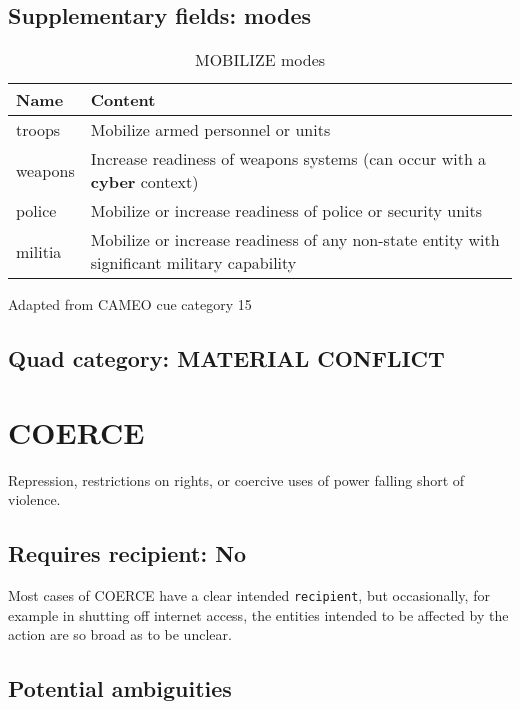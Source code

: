 \documentclass[11pt]{report}
\newcommand{\plcat}[1]{\textsf{#1}}
\newcommand{\plcon}[1]{\textbf{#1}}
\newcommand{\txt}[1]{\texttt{#1}}
\begin{document}
\subsection{Supplementary fields: modes }

\begin{table}[htp]
\caption{MOBILIZE modes}
\begin{center}
\begin{tabular}{|l|p{13cm}|}
\hline
Name & Content \\
\hline
troops & Mobilize armed personnel or units\\
weapons & Increase readiness of weapons systems (can occur with a \plcon{cyber} context) \\
police & Mobilize or increase readiness of police or security units\\
militia & Mobilize or increase readiness of any non-state entity with significant military capability\\
\hline
\end{tabular}
\end{center}
\label{tab:mobilizemode}
Adapted from CAMEO cue category 15
\end{table}


\subsection{Quad category: MATERIAL CONFLICT}

\newpage

\section{COERCE}

Repression, restrictions on rights, or coercive uses of power falling short of violence.

\subsection{Requires recipient: No}

Most cases of \plcat{COERCE} have a clear intended \txt{recipient}, but occasionally, for example in shutting off internet access, the entities intended to be affected by the action are so broad as to be unclear.

\subsection{Potential ambiguities}
\end{document}
